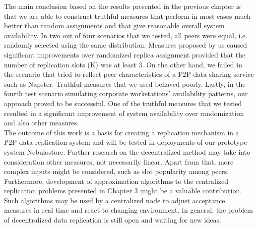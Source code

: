 \documentclass{pracamgren}
\begin{document}
The main conclusion based on the results presented in the previous chapter is that we are able to construct truthful measures that perform in most cases much better than random assignments and that give reasonable overall system availability. In two out of four scenarios that we tested, all peers were equal, i.e. randomly selected using the same distribution. Measures proposed by us caused significant improvements over randomized replica assignment provided that the number of replication slots (K) was at least 3. On the other hand, we failed in the scenario that tried to reflect peer characteristics of a P2P data sharing service such as Napster. Truthful measures that we used behaved poorly. Lastly, in the fourth test scenario simulating corporate workstations' availability patterns, our approach proved to be successful. One of the truthful measures that we tested resulted in a significant improvement of system availability over randomization and also other measures.\\

The outcome of this work is a basis for creating a replication mechanism in a P2P data replication system and will be tested in deployments of our prototype system Nebulostore. Further research on the decentralized method may take into consideration other measures, not necessarily linear. Apart from that, more complex inputs might be considered, such as slot popularity among peers. Furthermore, development of approximation algorithms to the centralized replication problems presented in Chapter 3 might be a valuable contribution. Such algorithms may be used by a centralized node to adjust acceptance measures in real time and react to changing environment. In general, the problem of decentralized data replication is still open and waiting for new ideas.\\

%
%
%
%




\end{document}
